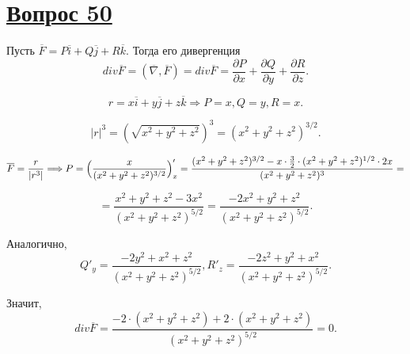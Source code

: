 \documentclass{report}
\begin{document}
\section{\underline{Вопрос 50}}

Пусть $\overline{F} = P \overline{i} + Q \overline{j} + R \overline{k}. $
Тогда его дивергенция \[div \overline{F} = (\overline{\nabla}, \overline{F}) =
div \overline{F} = \frac{\partial P}{\partial x} + \frac{\partial Q}{\partial y} + \frac{\partial R}{\partial z}.\]

\[
r = x \overline{i} + y \overline{j} + z \overline{k} \Longrightarrow P = x, Q = y, R = x.
\]

\[
|r|^3 = (\sqrt{x^2 + y^2 + z^2})^3 = (x^2 + y^2 + z^2)^{3/2}.
\]

\[
\overline{F} = \frac{r}{|r^3|} \Longrightarrow P = \Bigl( \frac{x}{(x^2 + y^2 + z^2)^{3/2}} \Bigr)'_x = 
\frac{(x^2 + y^2 + z^2)^{3/2} - x \cdot \frac{3}{2} \cdot (x^2 + y^2 + z^2)^{1/2} \cdot 2 x}{(x^2 + y^2 + z^2)^3} = 
\]

\[
= \frac{x^2 + y^2 + z^2 - 3x^2}{(x^2 + y^2 + z^2)^{5/2}} = \frac{-2 x^2 + y^2 + z^2}{(x^2 + y^2 + z^2)^{5/2}}.
\]

Аналогично, 
\[
Q'_y = \frac{-2 y^2 + x^2 + z^2}{(x^2 + y^2 + z^2)^{5/2}}, R'_z = \frac{-2 z^2 + y^2 + x^2}{(x^2 + y^2 + z^2)^{5/2}}.
\]

Значит,
\[
div \overline{F} = \frac{-2 \cdot (x^2 + y^2 + z^2) + 2 \cdot ( x^2 + y^2 + z^2)}{(x^2 + y^2 + z^2)^{5/2}} = 0.
\]
\newpage
\end{document}
